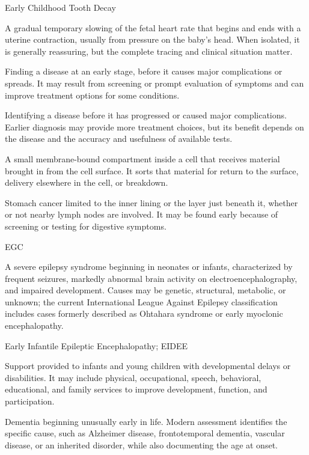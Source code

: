 \synonyms
Early Childhood Tooth Decay

 A gradual temporary slowing of the fetal heart rate that begins and ends with a uterine contraction, usually from pressure on the baby’s head. When isolated, it is generally reassuring, but the complete tracing and clinical situation matter.

 Finding a disease at an early stage, before it causes major complications or spreads. It may result from screening or prompt evaluation of symptoms and can improve treatment options for some conditions.

 Identifying a disease before it has progressed or caused major complications. Earlier diagnosis may provide more treatment choices, but its benefit depends on the disease and the accuracy and usefulness of available tests.

 A small membrane-bound compartment inside a cell that receives material brought in from the cell surface. It sorts that material for return to the surface, delivery elsewhere in the cell, or breakdown.

 Stomach cancer limited to the inner lining or the layer just beneath it, whether or not nearby lymph nodes are involved. It may be found early because of screening or testing for digestive symptoms.

\synonyms
EGC

 A severe epilepsy syndrome beginning in neonates or infants, characterized by frequent seizures, markedly abnormal brain activity on electroencephalography, and impaired development. Causes may be genetic, structural, metabolic, or unknown; the current International League Against Epilepsy classification includes cases formerly described as Ohtahara syndrome or early myoclonic encephalopathy.

\synonyms
Early Infantile Epileptic Encephalopathy; EIDEE

 Support provided to infants and young children with developmental delays or disabilities. It may include physical, occupational, speech, behavioral, educational, and family services to improve development, function, and participation.

 Dementia beginning unusually early in life. Modern assessment identifies the specific cause, such as Alzheimer disease, frontotemporal dementia, vascular disease, or an inherited disorder, while also documenting the age at onset.

